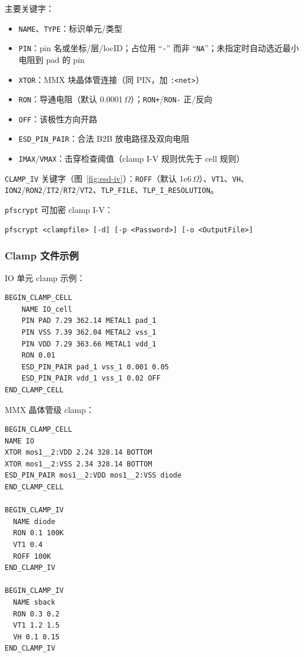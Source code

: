 主要关键字：
\begin{itemize}
  \item \texttt{NAME}、\texttt{TYPE}：标识单元/类型
  \item \texttt{PIN}：pin 名或坐标/层/locID；占位用 ``\texttt{-}'' 而非 ``\texttt{NA}''；未指定时自动选近最小电阻到 pad 的 pin
  \item \texttt{XTOR}：MMX 块晶体管连接（同 PIN，加 \texttt{:<net>}）
  \item \texttt{RON}：导通电阻（默认 0.0001\,$\Omega$）；\texttt{RON+}/\texttt{RON-} 正/反向
  \item \texttt{OFF}：该极性方向开路
  \item \texttt{ESD\_PIN\_PAIR}：合法 B2B 放电路径及双向电阻
  \item \texttt{IMAX}/\texttt{VMAX}：击穿检查阈值（clamp I-V 规则优先于 cell 规则）
\end{itemize}

\texttt{CLAMP\_IV} 关键字（图~\ref{fig:esd-iv}）：\texttt{ROFF}（默认 1e6\,$\Omega$）、\texttt{VT1}、\texttt{VH}、\texttt{ION2}/\texttt{RON2}/\texttt{IT2}/\texttt{RT2}/\texttt{VT2}、\texttt{TLP\_FILE}、\texttt{TLP\_I\_RESOLUTION}。


\texttt{pfscrypt} 可加密 clamp I-V：
\begin{lstlisting}
pfscrypt <clampfile> [-d] [-p <Password>] [-o <OutputFile>]
\end{lstlisting}

\subsubsection{Clamp 文件示例}
IO 单元 clamp 示例：
\begin{lstlisting}
BEGIN_CLAMP_CELL
    NAME IO_cell
    PIN PAD 7.29 362.14 METAL1 pad_1
    PIN VSS 7.39 362.04 METAL2 vss_1
    PIN VDD 7.29 363.66 METAL1 vdd_1
    RON 0.01
    ESD_PIN_PAIR pad_1 vss_1 0.001 0.05
    ESD_PIN_PAIR vdd_1 vss_1 0.02 OFF
END_CLAMP_CELL
\end{lstlisting}

MMX 晶体管级 clamp：
\begin{lstlisting}
BEGIN_CLAMP_CELL
NAME IO
XTOR mos1__2:VDD 2.24 328.14 BOTTOM
XTOR mos1__2:VSS 2.34 328.14 BOTTOM
ESD_PIN_PAIR mos1__2:VDD mos1__2:VSS diode
END_CLAMP_CELL

BEGIN_CLAMP_IV
  NAME diode
  RON 0.1 100K
  VT1 0.4
  ROFF 100K
END_CLAMP_IV

BEGIN_CLAMP_IV
  NAME sback
  RON 0.3 0.2
  VT1 1.2 1.5
  VH 0.1 0.15
END_CLAMP_IV
\end{lstlisting}

